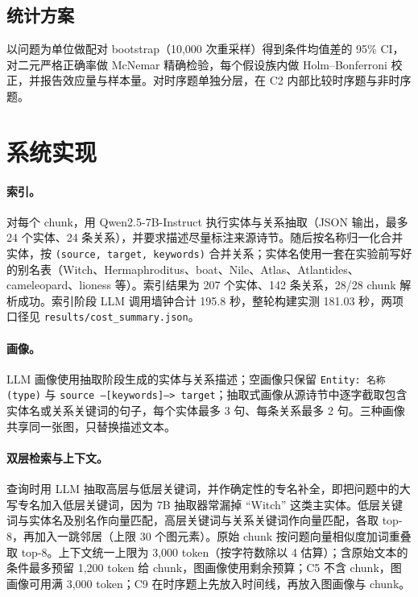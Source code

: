 \documentclass[11pt,a4paper]{ctexart}
\begin{document}
\subsection{统计方案}

以问题为单位做配对 bootstrap（10,000 次重采样）得到条件均值差的 95\% CI，对二元严格正确率做 McNemar 精确检验，每个假设族内做 Holm--Bonferroni 校正，并报告效应量与样本量。对时序题单独分层，在 C2 内部比较时序题与非时序题。

\section{系统实现}
\label{sec:impl}

\paragraph{索引。}
对每个 chunk，用 Qwen2.5-7B-Instruct 执行实体与关系抽取（JSON 输出，最多 24 个实体、24 条关系），并要求描述尽量标注来源诗节。随后按名称归一化合并实体，按 \texttt{(source, target, keywords)} 合并关系；实体名使用一套在实验前写好的别名表（Witch、Hermaphroditus、boat、Nile、Atlas、Atlantides、cameleopard、lioness 等）。索引结果为 207 个实体、142 条关系，28/28 chunk 解析成功。索引阶段 LLM 调用墙钟合计 195.8 秒，整轮构建实测 181.03 秒，两项口径见 \texttt{results/cost\_summary.json}。

\paragraph{画像。}
LLM 画像使用抽取阶段生成的实体与关系描述；空画像只保留 \texttt{Entity: 名称 (type)} 与 \texttt{source --[keywords]--> target}；抽取式画像从源诗节中逐字截取包含实体名或关系关键词的句子，每个实体最多 3 句、每条关系最多 2 句。三种画像共享同一张图，只替换描述文本。

\paragraph{双层检索与上下文。}
查询时用 LLM 抽取高层与低层关键词，并作确定性的专名补全，即把问题中的大写专名加入低层关键词，因为 7B 抽取器常漏掉 “Witch” 这类主实体。低层关键词与实体名及别名作向量匹配，高层关键词与关系关键词作向量匹配，各取 top-8，再加入一跳邻居（上限 30 个图元素）。原始 chunk 按问题向量相似度加词重叠取 top-8。上下文统一上限为 3,000 token（按字符数除以 4 估算）；含原始文本的条件最多预留 1,200 token 给 chunk，图画像使用剩余预算；C5 不含 chunk，图画像可用满 3,000 token；C9 在时序题上先放入时间线，再放入图画像与 chunk。
\end{document}
